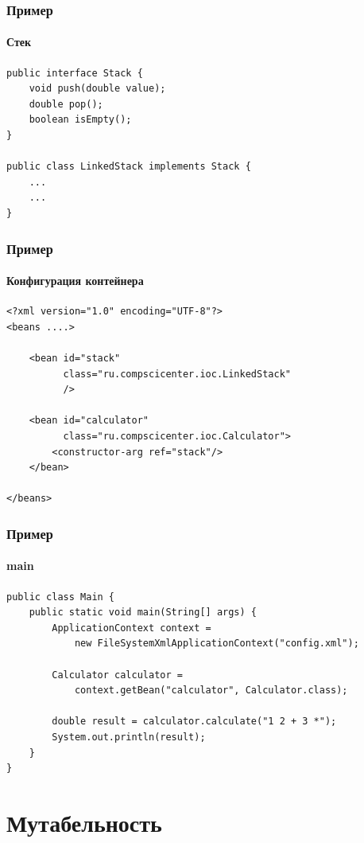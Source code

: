\documentclass{../mcsslides}
\begin{document}
    \begin{frame}[fragile]
        \frametitle{Пример}
        \framesubtitle{Стек}
        \begin{verbatim}
public interface Stack {
    void push(double value);
    double pop();
    boolean isEmpty();
}

public class LinkedStack implements Stack {
    ...
    ...
}
        \end{verbatim}
    \end{frame}

    \begin{frame}[fragile]
        \frametitle{Пример}
        \framesubtitle{Конфигурация контейнера}
        \begin{verbatim}
<?xml version="1.0" encoding="UTF-8"?>
<beans ....>

    <bean id="stack"
          class="ru.compscicenter.ioc.LinkedStack"
          />

    <bean id="calculator"
          class="ru.compscicenter.ioc.Calculator">
        <constructor-arg ref="stack"/>
    </bean>

</beans>
        \end{verbatim}
    \end{frame}

    \begin{frame}[fragile]
        \frametitle{Пример}
        \framesubtitle{main}
        \begin{verbatim}
public class Main {
    public static void main(String[] args) {
        ApplicationContext context = 
            new FileSystemXmlApplicationContext("config.xml");

        Calculator calculator = 
            context.getBean("calculator", Calculator.class);

        double result = calculator.calculate("1 2 + 3 *");
        System.out.println(result);
    }
}
        \end{verbatim}
    \end{frame}

    \section{Мутабельность}
\end{document}
